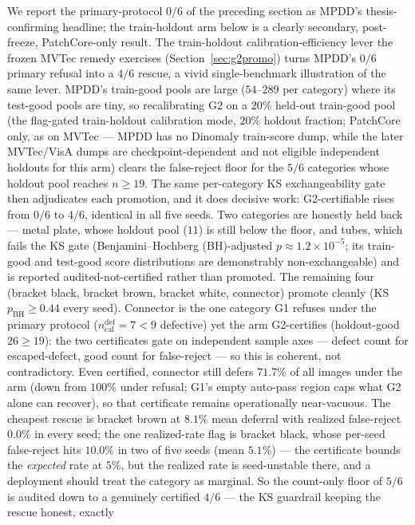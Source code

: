 \documentclass[preprint,11pt]{elsarticle}
\begin{document}
We report the primary-protocol $0/6$ of the preceding section as MPDD's thesis-confirming
headline; the train-holdout arm below is a clearly secondary, post-freeze, PatchCore-only result.
The train-holdout calibration-efficiency lever the frozen MVTec remedy exercises
(Section~\ref{sec:g2promo}) turns MPDD's $0/6$ primary refusal into a $4/6$ rescue, a vivid
single-benchmark illustration of the same lever. MPDD's train-good pools are large ($54$--$289$ per category) where its
test-good pools are tiny, so recalibrating G2 on a $20\%$ held-out train-good pool (the flag-gated
train-holdout calibration mode, $20\%$ holdout fraction; PatchCore only, as on
MVTec --- MPDD has no Dinomaly train-score dump, while the later MVTec/VisA dumps are
checkpoint-dependent and not eligible independent holdouts for this arm)
clears the false-reject floor for the $5/6$ categories whose holdout pool reaches $n\ge 19$. The
same per-category KS exchangeability gate then adjudicates each promotion, and it does decisive
work: G2-certifiable rises from $0/6$ to $4/6$, identical in all five seeds. Two
categories are honestly held back --- metal plate, whose holdout pool ($11$) is still
below the floor, and tubes, which fails the KS gate (Benjamini--Hochberg (BH)-adjusted $p\approx
1.2\times10^{-5}$; its train-good and test-good score distributions are demonstrably
non-exchangeable) and is reported audited-not-certified rather than promoted. The remaining four
(bracket black, bracket brown, bracket white, connector)
promote cleanly (KS $p_{\text{BH}}\ge 0.44$ every seed). Connector is the one category
G1 refuses under the primary protocol ($n_{\text{cal}}^{\text{def}}=7<9$ defective) yet
the arm G2-certifies (holdout-good $26\ge 19$): the two certificates gate on independent sample
axes --- defect count for escaped-defect, good count for false-reject --- so this is coherent, not
contradictory. Even certified, connector still defers $71.7\%$ of all images under the arm
(down from $100\%$ under refusal; G1's empty auto-pass region caps what G2 alone can recover),
so that certificate remains operationally near-vacuous. The cheapest rescue is bracket brown at
$8.1\%$ mean deferral with realized false-reject $0.0\%$ in every seed; the one realized-rate
flag is bracket black, whose per-seed false-reject hits $10.0\%$ in two of five seeds (mean
$5.1\%$) --- the certificate bounds the \emph{expected} rate at $5\%$, but the realized rate is
seed-unstable there, and a deployment should treat the category as marginal. So the count-only
floor of $5/6$ is
audited down to a genuinely certified $4/6$ --- the KS guardrail keeping the rescue honest, exactly
\end{document}
